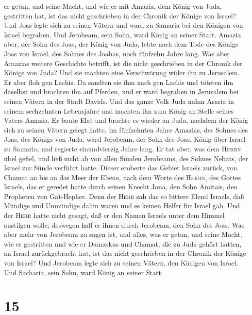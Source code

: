 er getan, und seine Macht, und wie er mit Amazia, dem König von Juda,
gestritten hat, ist das nicht geschrieben in der Chronik der Könige von
Israel?  Und Joas legte sich zu seinen Vätern und ward zu
Samaria bei den Königen von Israel begraben. Und Jerobeam, sein Sohn,
ward König an seiner Statt.  Amazia aber, der Sohn des
Joas, der König von Juda, lebte nach dem Tode des Königs Joas von
Israel, des Sohnes des Joahas, noch fünfzehn Jahre lang. 
Was aber Amazias weitere Geschichte betrifft, ist die nicht geschrieben
in der Chronik der Könige von Juda?  Und sie machten eine
Verschwörung wider ihn zu Jerusalem. Er aber floh gen Lachis. Da sandten
sie ihm nach gen Lachis und töteten ihn daselbst  und
brachten ihn auf Pferden, und er ward begraben in Jerusalem bei seinen
Vätern in der Stadt Davids.  Und das ganze Volk Juda nahm
Asaria in seinem sechzehnten Lebensjahre und machten ihn zum König an
Stelle seines Vaters Amazia.  Er baute Elat und brachte
es wieder an Juda, nachdem der König sich zu seinen Vätern gelegt hatte.
 Im fünfzehnten Jahre Amazias, des Sohnes des Joas, des
Königs von Juda, ward Jerobeam, der Sohn des Joas, König über Israel zu
Samaria, und regierte einundvierzig Jahre lang.  Er tat
aber, was dem \textsc{Herrn} übel gefiel, und ließ nicht ab von allen
Sünden Jerobeams, des Sohnes Nebats, der Israel zur Sünde verführt
hatte.  Dieser eroberte das Gebiet Israels zurück, von
Chamat an bis an das Meer der Ebene, nach dem Worte des \textsc{Herrn},
des Gottes Israels, das er geredet hatte durch seinen Knecht Jona, den
Sohn Amitais, den Propheten von Gat-Hepher.  Denn der
\textsc{Herr} sah das so bittere Elend Israels, daß Mündige und
Unmündige dahin waren und es keinen Helfer für Israel gab.
 Und der \textsc{Herr} hatte nicht gesagt, daß er den
Namen Israels unter dem Himmel austilgen wolle; deswegen half er ihnen
durch Jerobeam, den Sohn des Joas.  Was aber mehr von
Jerobeam zu sagen ist, und alles, was er getan, und seine Macht, wie er
gestritten und wie er Damaskus und Chamat, die zu Juda gehört hatten, an
Israel zurückgebracht hat, ist das nicht geschrieben in der Chronik der
Könige von Israel?  Und Jerobeam legte sich zu seinen
Vätern, den Königen von Israel. Und Sacharia, sein Sohn, ward König an
seiner Statt.

\hypertarget{section-14}{%
\section{15}\label{section-14}}

